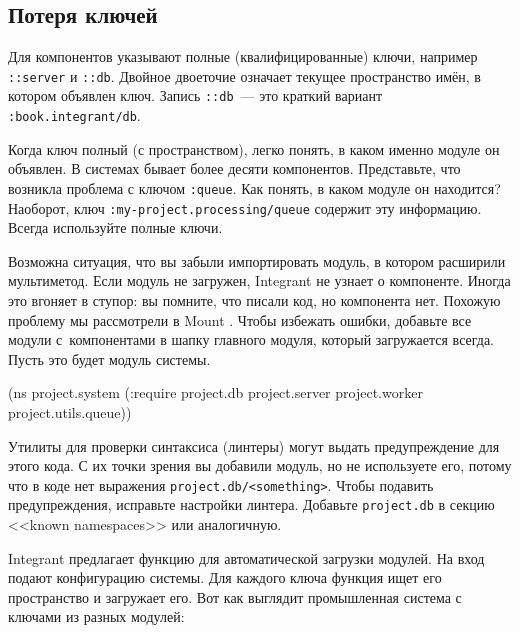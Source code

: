 \fi

\subsection{Потеря ключей}


Для компонентов указывают полные (квалифицированные) ключи, например
\verb|::server| и \verb|::db|. Двойное двоеточие означает текущее пространство
имён, в котором объявлен ключ. Запись \verb|::db|~--- это краткий вариант
\verb|:book.integrant/db|.

Когда ключ полный (с пространством), легко понять, в каком именно модуле он
объявлен. В системах бывает более десяти компонентов. Представьте, что возникла
проблема с ключом \verb|:queue|. Как понять, в каком модуле он находится?
Наоборот, ключ \verb|:my-project.processing/queue| содержит эту
информацию. Всегда используйте полные ключи.

Возможна ситуация, что вы забыли импортировать модуль, в котором расширили
мультиметод. Если модуль не загружен, Integrant не узнает о компоненте. Иногда
это вгоняет в ступор: вы помните, что писали код, но компонента нет. Похожую
проблему мы рассмотрели в Mount . Чтобы избежать ошибки,
добавьте все модули с~компонентами в шапку главного модуля, который загружается
всегда. Пусть это будет модуль системы.

\begin{english}
  \begin{clojure}
(ns project.system
  (:require project.db
            project.server
            project.worker
            project.utils.queue))
  \end{clojure}
\end{english}

Утилиты для проверки синтаксиса (линтеры) могут выдать предупреждение для этого
кода. С их точки зрения вы добавили модуль, но не используете его, потому что в
коде нет выражения \verb|project.db/<something>|. Чтобы подавить предупреждения,
исправьте настройки линтера. Добавьте \verb|project.db| в секцию <<known
namespaces>> или аналогичную.


Integrant предлагает функцию  для автоматической загрузки
модулей. На вход подают конфигурацию системы. Для каждого ключа функция ищет его
пространство и загружает его. Вот как выглядит промышленная система с ключами из
разных модулей:

